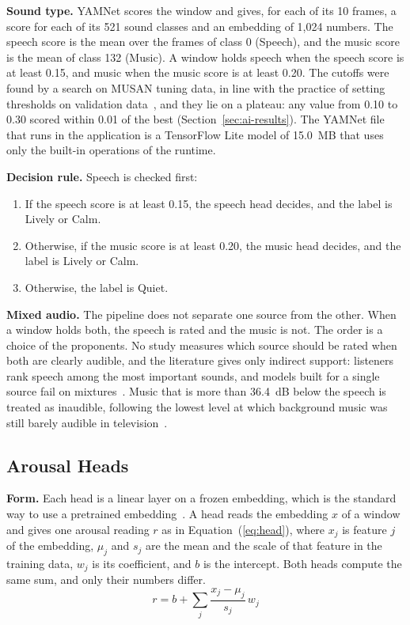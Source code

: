 \textbf{Sound type.} YAMNet scores the window and gives, for each of its 10 frames, a score for each of its 521 sound classes and an embedding of 1,024 numbers. The speech score is the mean over the frames of class 0 (Speech), and the music score is the mean of class 132 (Music). A window holds speech when the speech score is at least 0.15, and music when the music score is at least 0.20. The cutoffs were found by a search on MUSAN tuning data, in line with the practice of setting thresholds on validation data~\cite{cances2019postprocessing}, and they lie on a plateau: any value from 0.10 to 0.30 scored within 0.01 of the best (Section~\ref{sec:ai-results}). The YAMNet file that runs in the application is a TensorFlow Lite model of 15.0~MB that uses only the built-in operations of the runtime.

\textbf{Decision rule.} Speech is checked first:
\begin{enumerate}
    \item If the speech score is at least 0.15, the speech head decides, and the label is Lively or Calm.
    \item Otherwise, if the music score is at least 0.20, the music head decides, and the label is Lively or Calm.
    \item Otherwise, the label is Quiet.
\end{enumerate}

\textbf{Mixed audio.} The pipeline does not separate one source from the other. When a window holds both, the speech is rated and the music is not. The order is a choice of the proponents. No study measures which source should be rated when both are clearly audible, and the literature gives only indirect support: listeners rank speech among the most important sounds, and models built for a single source fail on mixtures~\cite{liu2025salience,laugs2020mixed}. Music that is more than 36.4~dB below the speech is treated as inaudible, following the lowest level at which background music was still barely audible in television~\cite{batlleroca2023background}.

\subsection{Arousal Heads}
\label{sec:ai-heads}
\textbf{Form.} Each head is a linear layer on a frozen embedding, which is the standard way to use a pretrained embedding~\cite{niizumi2023byola,koh2021embeddings}. A head reads the embedding $x$ of a window and gives one arousal reading $r$ as in Equation~(\ref{eq:head}), where $x_j$ is feature $j$ of the embedding, $\mu_j$ and $s_j$ are the mean and the scale of that feature in the training data, $w_j$ is its coefficient, and $b$ is the intercept. Both heads compute the same sum, and only their numbers differ.
\begin{equation}\label{eq:head}
    r = b + \sum_j \frac{x_j - \mu_j}{s_j}\, w_j
\end{equation}

